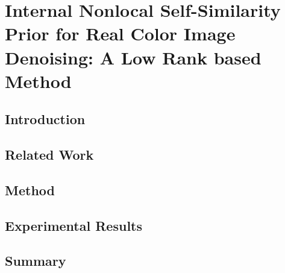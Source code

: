 %
\chapter{Internal Nonlocal Self-Similarity Prior for Real Color Image Denoising: A Low Rank based Method}
\label{sec:internallr}


\blindtext

\section{Introduction}
\label{sec:feature:intro}

\blindtext

\section{Related Work}
\label{sec:feature:related}

\blindtext

\section{Method}
\label{sec:feature:theory}

\blindtext

\section{Experimental Results}
\label{sec:feature:results}

\blindtext

\section{Summary}
\label{sec:feature:summary}

\blindtext
